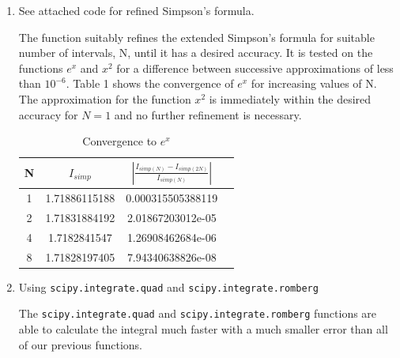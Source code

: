 \documentclass{article}
\begin{document}
\begin{enumerate}
	\item See attached code for refined Simpson's formula.
	
	The function suitably refines the extended Simpson's formula for suitable number of intervals, N, until it has a desired accuracy. It is tested on the functions $e^x$ and $x^2$ for a difference between successive approximations of less than $10^{-6}$. Table 1 shows the convergence of $e^x$ for increasing values of N. The approximation for the function $x^2$ is immediately within the desired accuracy for $N = 1$ and no further refinement is necessary.
	
	\begin{table}[!ht]
		\caption{Convergence to $e^x$}
		\begin{center}
			\begin{tabular}{| c | c | c | c |}
				\hline
				N & $I_{simp}$ & $\left|\frac{I_{simp(N)} - I_{simp(2N)}}{I_{simp(N)}}\right|$\\
				\hline \hline
				1 & 1.71886115188 & 0.000315505388119 \\ \hline
				2 & 1.71831884192 & 2.01867203012e-05 \\ \hline
				4 & 1.7182841547 & 1.26908462684e-06 \\ \hline
				8 & 1.71828197405 & 7.94340638826e-08 \\ \hline
			\end{tabular}
		\end{center}
	\end{table}
	
	\item Using \texttt{scipy.integrate.quad} and \texttt{scipy.integrate.romberg}
	
	The \texttt{scipy.integrate.quad} and \texttt{scipy.integrate.romberg} functions are able to calculate the integral much faster with a much smaller error than all of our previous functions.

\end{enumerate}
\end{document}
